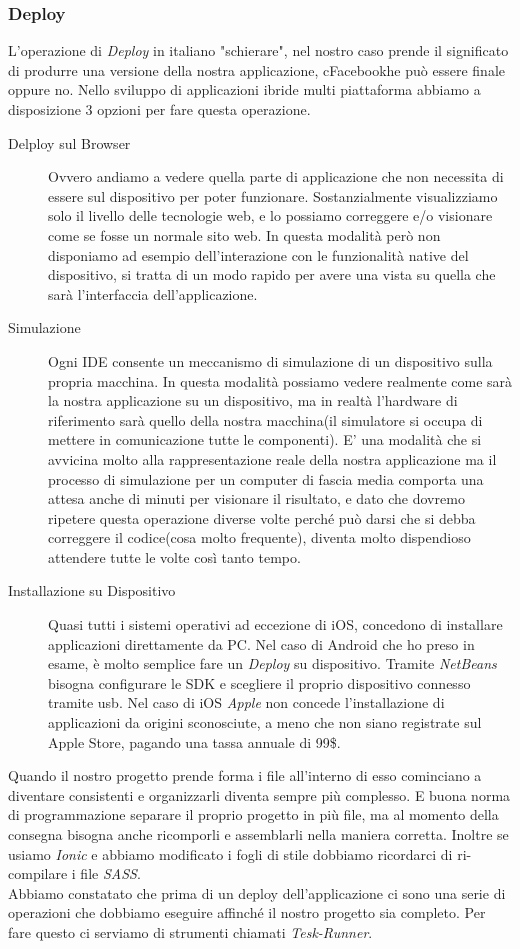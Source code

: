 \subsubsection{Deploy}
L'operazione di \emph{Deploy} in italiano "schierare", nel nostro caso prende il significato di produrre una versione della nostra applicazione, cFacebookhe può essere finale oppure no. Nello sviluppo di applicazioni ibride multi piattaforma abbiamo a disposizione 3 opzioni per fare questa operazione.
\begin{description}
\item[Delploy sul Browser] Ovvero andiamo a vedere quella parte di applicazione che non necessita di essere sul dispositivo per poter funzionare. Sostanzialmente visualizziamo solo il livello delle tecnologie web, e lo possiamo correggere e/o visionare come se fosse un normale sito web. In questa modalità però non disponiamo ad esempio dell'interazione con le funzionalità native del dispositivo, si tratta di un modo rapido per avere una vista su quella che sarà l'interfaccia dell'applicazione.
\item[Simulazione] Ogni IDE consente un meccanismo di simulazione di un dispositivo sulla propria macchina. In questa modalità possiamo vedere realmente come sarà la nostra applicazione su un dispositivo, ma in realtà l'hardware di riferimento sarà quello della nostra macchina(il simulatore si occupa di mettere in comunicazione tutte le componenti). E' una modalità che si avvicina molto alla rappresentazione reale della nostra applicazione ma il processo di simulazione per un computer di fascia media comporta una attesa anche di minuti per visionare il risultato, e dato che dovremo ripetere questa operazione diverse volte perché può darsi che si debba correggere il codice(cosa molto frequente), diventa molto dispendioso attendere tutte le volte così tanto tempo.
\item[Installazione su Dispositivo] Quasi tutti i sistemi operativi ad eccezione di iOS, concedono di installare applicazioni direttamente da PC. Nel caso di Android che ho preso in esame, è molto semplice fare un \emph{Deploy} su dispositivo. Tramite \emph{NetBeans} bisogna configurare le SDK e scegliere il proprio dispositivo connesso tramite usb. Nel caso di iOS \emph{Apple} non concede l'installazione di applicazioni da origini sconosciute, a meno che non siano registrate sul Apple Store, pagando una tassa annuale di 99\$.
\end{description}
Quando il nostro progetto prende forma i file all'interno di esso cominciano a diventare consistenti e organizzarli diventa sempre più complesso. E buona norma di programmazione separare il proprio progetto in più file, ma al momento della consegna bisogna anche ricomporli e assemblarli nella maniera corretta. Inoltre se usiamo \emph{Ionic} e abbiamo modificato i fogli di stile dobbiamo ricordarci di ri-compilare i file \emph{SASS}.\\
Abbiamo constatato che prima di un deploy dell'applicazione ci sono una serie di operazioni che dobbiamo eseguire affinché il nostro progetto sia completo. Per fare questo ci serviamo di strumenti chiamati \emph{Tesk-Runner}.
